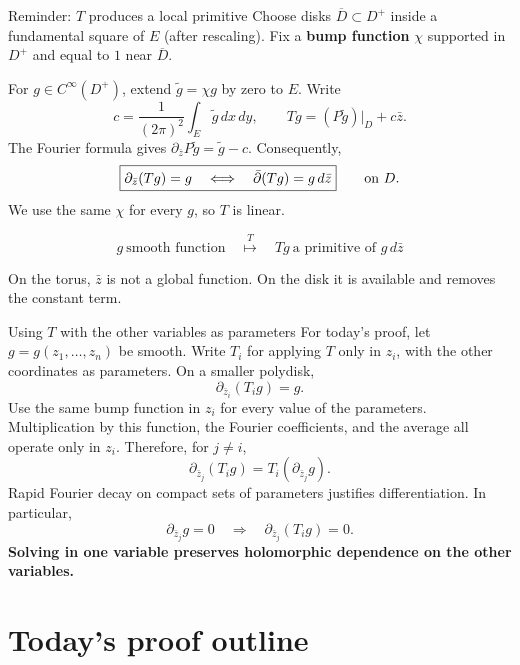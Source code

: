 \documentclass[aspectratio=169,11pt]{beamer}
\newcommand{\db}{\bar\partial}
\begin{document}
\begin{frame}{Reminder: $T$ produces a local primitive}
\setlength{\parskip}{3pt}
\setlength{\abovedisplayskip}{4pt}
\setlength{\belowdisplayskip}{4pt}
Choose disks $\overline D\subset D^+$ inside a fundamental square of $E$
(after rescaling).
Fix a \textbf{bump function} $\chi$ supported in $D^+$ and equal to $1$
near $\overline D$.

For $g\in C^\infty(D^+)$, extend $\widetilde g=\chi g$ by zero to $E$. Write
\[
 c=\frac1{(2\pi)^2}\int_E\widetilde g\,dx\,dy,\qquad
 Tg=(P\widetilde g)|_D+c\bar z.
\]
The Fourier formula gives $\partial_{\bar z}P\widetilde g=\widetilde g-c$.
Consequently,
\[
 \boxed{\partial_{\bar z}(Tg)=g
 \quad\Longleftrightarrow\quad
 \db(Tg)=g\,d\bar z}\qquad\hbox{on }D.
\]
We use the same $\chi$ for every $g$, so $T$ is linear.

\[
 \boxed{
 g\ \text{smooth function}
 \quad\overset{T}{\longmapsto}\quad
 Tg\ \text{a primitive of }g\,d\bar z
 }
\]

On the torus, $\bar z$ is not a global function.
On the disk it is available and removes the constant term.
\end{frame}

\begin{frame}{Using $T$ with the other variables as parameters}
For today's proof, let $g=g(z_1,\ldots,z_n)$ be smooth.
Write $T_i$ for applying $T$ only in $z_i$, with the other coordinates
as parameters. On a smaller polydisk,
\[
 \partial_{\bar z_i}(T_i g)=g.
\]
Use the same bump function in $z_i$ for every value of the parameters.
Multiplication by this function, the Fourier coefficients, and the average
all operate only in $z_i$. Therefore, for $j\ne i$,
\[
 \partial_{\bar z_j}(T_i g)=T_i(\partial_{\bar z_j}g).
\]
Rapid Fourier decay on compact sets of parameters justifies differentiation.
In particular,
\[
 \partial_{\bar z_j}g=0\quad\Longrightarrow\quad
 \partial_{\bar z_j}(T_i g)=0.
\]
\textbf{Solving in one variable preserves holomorphic dependence
on the other variables.}
\end{frame}

\section{Today's proof outline}
\end{document}
